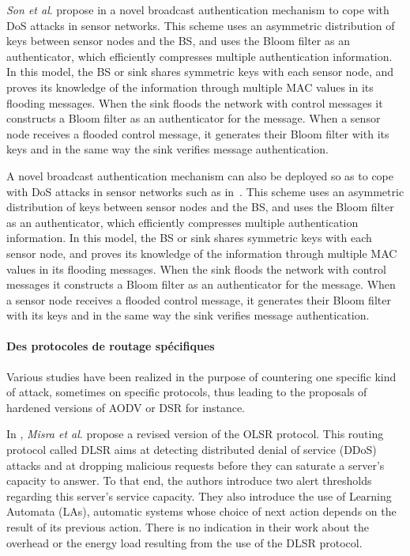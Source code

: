 \textit{Son et al}. propose in
\cite{SLS10}
a novel broadcast authentication mechanism to cope with DoS attacks in sensor networks.
This scheme uses an asymmetric distribution of keys between sensor nodes and the BS, and uses the Bloom filter as an authenticator, which efficiently compresses multiple authentication information.
In this model, the BS or sink shares symmetric keys with each sensor node, and proves its knowledge of the information through multiple MAC values in its flooding messages.
When the sink floods the network with control messages it constructs a Bloom filter as an authenticator for the message.
When a sensor node receives a flooded control message, it generates their Bloom filter with its keys and in the same way the sink verifies message authentication.

A novel broadcast authentication mechanism can also be deployed so as to cope with DoS attacks in sensor networks such as in~\cite{SLS10}.
This scheme uses an asymmetric distribution of keys between sensor nodes and the BS, and uses the Bloom filter as an authenticator, which efficiently compresses multiple authentication information.
In this model, the BS or sink shares symmetric keys with each sensor node, and proves its knowledge of the information through multiple MAC values in its flooding messages.
When the sink floods the network with control messages it constructs a Bloom filter as an authenticator for the message.
When a sensor node receives a flooded control message, it generates their Bloom filter with its keys and in the same way the sink verifies message authentication.



    \paragraph{Des protocoles de routage spécifiques}

Various studies have been realized in the purpose of countering one specific kind of attack, sometimes on specific protocols, thus leading to the proposals of hardened versions of AODV\cite{DLA02} or DSR\cite{CT04} for instance.


In
\cite{MKASF10},
\textit{Misra et al}. propose a revised version of the OLSR protocol.
This routing protocol called DLSR aims at detecting distributed denial of service (DDoS) attacks and at dropping malicious requests before they can saturate a server's capacity to answer.
To that end, the authors introduce two alert thresholds regarding this server's service capacity.
They also introduce the use of Learning Automata (LAs), automatic systems whose choice of next action depends on the result of its previous action.
There is no indication in their work about the overhead or the energy load resulting from the use of the DLSR protocol.

